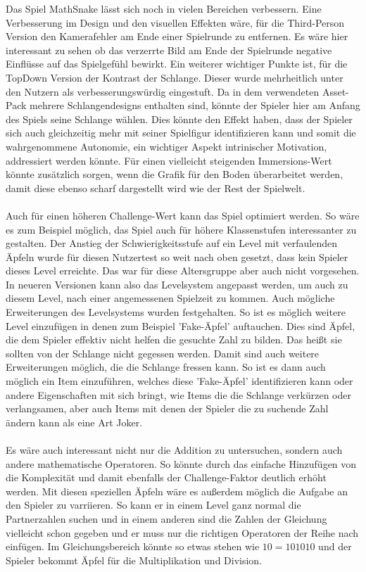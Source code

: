 Das Spiel MathSnake lässt sich noch in vielen Bereichen verbessern. Eine Verbesserung im Design und den visuellen Effekten wäre, für die Third-Person Version den Kamerafehler am Ende einer Spielrunde zu entfernen. Es wäre hier interessant zu sehen ob das verzerrte Bild am Ende der Spielrunde negative Einflüsse auf das Spielgefühl bewirkt. Ein weiterer wichtiger Punkte ist, für die TopDown Version der Kontrast der Schlange. Dieser wurde mehrheitlich unter den Nutzern als verbesserungswürdig eingestuft. Da in dem verwendeten Asset-Pack mehrere Schlangendesigns enthalten sind, könnte der Spieler hier am Anfang des Spiels seine Schlange wählen. Dies könnte den Effekt haben, dass der Spieler sich auch gleichzeitig mehr mit seiner Spielfigur identifizieren kann und somit die wahrgenommene Autonomie, ein wichtiger Aspekt intrinischer Motivation\cite{Deci2000TheW}, addressiert werden könnte. Für einen vielleicht steigenden Immersions-Wert könnte zusätzlich sorgen, wenn die Grafik für den Boden überarbeitet werden, damit diese ebenso scharf dargestellt wird wie der Rest der Spielwelt.\\
\\
Auch für einen höheren Challenge-Wert kann das Spiel optimiert werden. So wäre es zum Beispiel möglich, das Spiel auch für höhere Klassenstufen interessanter zu gestalten. Der Anstieg der Schwierigkeitsstufe auf ein Level mit verfaulenden Äpfeln wurde für diesen Nutzertest so weit nach oben gesetzt, dass kein Spieler dieses Level erreichte. Das war für diese Altersgruppe aber auch nicht vorgesehen. In neueren Versionen kann also das Levelsystem angepasst werden, um auch zu diesem Level, nach einer angemessenen Spielzeit zu kommen. Auch mögliche Erweiterungen des Levelsystems wurden festgehalten. So ist es möglich weitere Level einzufügen in denen zum Beispiel 'Fake-Äpfel' auftauchen. Dies sind Äpfel, die dem Spieler effektiv nicht helfen die gesuchte Zahl zu bilden. Das heißt sie sollten von der Schlange nicht gegessen werden. Damit sind auch weitere Erweiterungen möglich, die die Schlange fressen kann. So ist es dann auch möglich ein Item einzuführen, welches diese 'Fake-Äpfel' identifizieren kann oder andere Eigenschaften mit sich bringt, wie Items die die Schlange verkürzen oder verlangsamen, aber auch Items mit denen der Spieler die zu suchende Zahl ändern kann als eine Art Joker.\\
\\
Es wäre auch interessant nicht nur die Addition zu untersuchen, sondern auch andere mathematische Operatoren. So könnte durch das einfache Hinzufügen von  die Komplexität und damit ebenfalls der Challenge-Faktor deutlich erhöht werden. Mit diesen speziellen Äpfeln wäre es außerdem möglich die Aufgabe an den Spieler zu varriieren. So kann er in einem Level ganz normal die Partnerzahlen suchen und in einem anderen sind die Zahlen der Gleichung vielleicht schon gegeben und er muss nur die richtigen Operatoren der Reihe nach einfügen. Im Gleichungsbereich könnte so etwas stehen wie $10 = 10   10   10$ und der Spieler bekommt Äpfel für die Multiplikation und Division.\\
